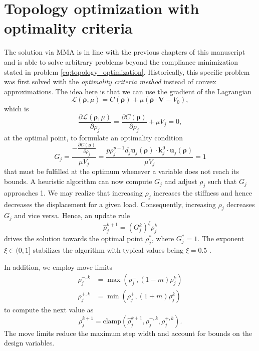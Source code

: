 \section{Topology optimization with optimality criteria}
The solution via MMA is in line with the previous chapters of this manuscript and is able to solve arbitrary problems beyond the compliance minimization stated in problem \eqref{eq:topology_optimization}. Historically, this specific problem was first solved with the \emph{optimality criteria method} instead of convex approximations. The idea here is that we can use the gradient of the Lagrangian
\begin{equation}
    \mathcal{L}(\pmb{\rho}, \mu) = C(\pmb{\rho}) + \mu \left( \pmb{\rho} \cdot \mathbf{V} - V_0 \right),
\end{equation}
which is
\begin{equation}
    \frac{\partial \mathcal{L} (\pmb{\rho}, \mu)}{\partial\rho_j} 
    = \frac{\partial C(\pmb{\rho})}{\partial \rho_j} + \mu V_j = 0,
\end{equation}
at the optimal point, to formulate an optimality condition
\begin{equation}
    G_j = \frac{-\frac{\partial C(\pmb{\rho})}{\partial \rho_j}}{\mu V_j} = \frac{p \rho_j^{p-1} d_j \mathbf{u}_j(\pmb{\rho})  \cdot \mathbf{k}^0_j \cdot \mathbf{u}_j(\pmb{\rho})}{\mu V_j} = 1
\end{equation}
that must be fulfilled at the optimum whenever a variable does not reach its bounds.
A heuristic algorithm can now compute $G_j$ and adjust $\rho_j$ such that $G_j$ approaches 1. We may realize that increasing $\rho_j$ increases the stiffness and hence decreases the displacement for a given load. Consequently, increasing $\rho_j$ decreases $G_j$ and vice versa. Hence, an update rule 
\begin{equation}
    \hat{\rho}_j^{k+1} = \left(G_j^k\right)^\xi \rho_j^k 
\end{equation}
drives the solution towards the optimal point $\rho_j^*$, where $G^*_j=1$. The exponent $\xi \in (0,1]$ stabilizes the algorithm with typical values being $\xi=0.5$ \cite{Harzheim2014}. 

In addition, we employ move limits 
\begin{align}
    \rho_j^{-,k} &= \max \left(\rho_j^-, (1-m)\rho_j^k \right) \\
    \rho_j^{+,k} &= \min \left(\rho_j^+, (1+m)\rho_j^k \right)
\end{align}
to compute the next value as 
\begin{equation}
    \rho_j^{k+1} = \textrm{clamp} \left(\hat{\rho}_j^{k+1}, \rho_j^{-,k}, \rho_j^{+,k} \right).
\end{equation}
The move limits reduce the maximum step width and account for bounds on the design variables. 

